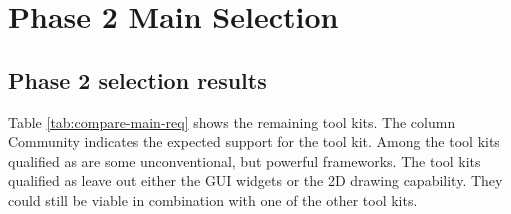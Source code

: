 \section{Phase 2 Main Selection}

\subsection{Phase 2 selection results}

Table \ref{tab:compare-main-req} shows the remaining tool kits. The column {\sc
Community} indicates the expected support for the tool kit. Among the tool kits
qualified as  are some unconventional, but powerful frameworks.  The
tool kits qualified as  leave out either the GUI widgets or the 2D
drawing capability. They could still be viable in combination with one of the
other tool kits.

